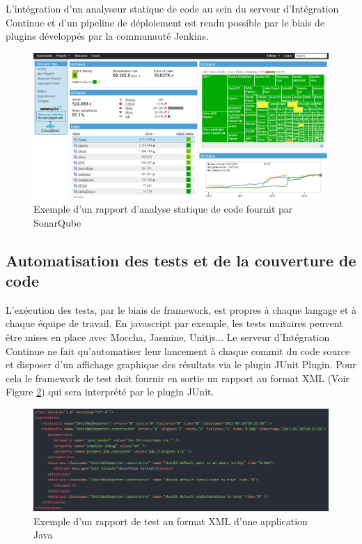     L'intégration d'un analyseur statique de code au sein du serveur d'Intégration Continue et d'un pipeline de déploiement est rendu possible par le biais de plugins développés par la communauté Jenkins.

    \begin{figure}
      \begin{center}
        \includegraphics[scale=0.3]{images/SonarQube.png}
      \end{center}
      \caption{Exemple d'un rapport d'analyse statique de code fournit par SonarQube}
      \label{SonarQube}
    \end{figure}

    \subsection{Automatisation des tests et de la couverture de code}
    L'exécution des tests, par le biais de framework, est propres à chaque langage et à chaque équipe de travail. En javascript par exemple, les tests unitaires peuvent être mises en place avec Moccha, Jasmine, Unitjs... Le serveur d'Intégration Continue ne fait qu'automatiser leur lancement à chaque commit du code source et disposer d'un affichage graphique des résultats via le plugin JUnit Plugin. Pour cela le framework de test doit fournir en sortie un rapport au format XML (Voir Figure \ref{ReportXML}) qui sera interprété par le plugin JUnit.

    \begin{figure}
      \begin{center}
        \includegraphics[scale=0.5]{images/ReportXML.png}
      \end{center}
      \caption{Exemple d'un rapport de test au format XML d'une application Java}
      \label{ReportXML}
    \end{figure}

